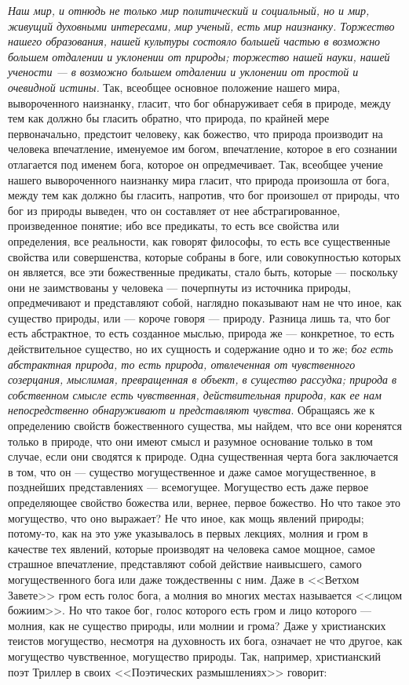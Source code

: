 \documentclass[12pt]{article}
\begin{document}
\emph{Наш мир, и отнюдь не только мир политический и социальный, но и мир, живущий духовными интересами, мир ученый, есть мир наизнанку. Торжество нашего образования, нашей культуры состояло большей частью в возможно большем отдалении и уклонении от природы; торжество нашей науки, нашей учености --- в возможно большем отдалении и уклонении от простой и очевидной истины.} Так, всеобщее основное положение нашего мира, вывороченного наизнанку, гласит, что бог обнаруживает себя в природе, между тем как должно бы гласить обратно, что природа, по крайней мере первоначально, предстоит человеку, как божество, что природа производит на человека впечатление, именуемое им богом, впечатление, которое в его сознании отлагается под именем бога, которое он опредмечивает. Так, всеобщее учение нашего вывороченного наизнанку мира гласит, что природа произошла от бога, между тем как должно бы гласить, напротив, что бог произошел от природы, что бог из природы выведен, что он составляет от нее абстрагированное, произведенное понятие; ибо все предикаты, то есть все свойства или определения, все реальности, как говорят философы, то есть все существенные свойства или совершенства, которые собраны в боге, или совокупностью которых он является, все эти божественные предикаты, стало быть, которые --- поскольку они не заимствованы у человека --- почерпнуты из источника природы, опредмечивают и представляют собой, наглядно показывают нам не что иное, как существо природы, или --- короче говоря --- природу. Разница лишь та, что бог есть абстрактное, то есть созданное мыслью, природа же --- конкретное, то есть действительное существо, но их сущность и содержание одно и то же; \emph{бог есть абстрактная природа, то есть природа, отвлеченная от чувственного созерцания, мыслимая, превращенная в объект, в существо рассудка; 
природа в собственном смысле есть чувственная, действительная природа, как ее нам непосредственно обнаруживают и представляют чувства}. Обращаясь же к определению свойств божественного существа, мы найдем, что все они коренятся только в природе, что они имеют смысл и разумное основание только в том случае, если они сводятся к природе. Одна существенная черта бога заключается в том, что он --- существо могущественное и даже самое могущественное, в позднейших представлениях --- всемогущее. Могущество есть даже первое определяющее свойство божества или, вернее, первое божество. Но что такое это могущество, что оно выражает? Не что иное, как мощь явлений природы; потому-то, как на это уже указывалось в первых лекциях, молния и гром в качестве тех явлений, которые производят на человека самое мощное, самое страшное впечатление, представляют собой действие наивысшего, самого могущественного бога или даже тождественны с ним. Даже в <<Ветхом Завете>> гром есть голос бога, а молния во многих местах называется <<лицом божиим>>. Но что такое бог, голос которого есть гром и лицо которого --- молния, как не существо природы, или молнии и грома? Даже у христианских теистов могущество, несмотря на духовность их бога, означает не что другое, как могущество чувственное, могущество природы. Так, например, христианский поэт Триллер в своих <<Поэтических размышлениях>> говорит: 
\end{document}
